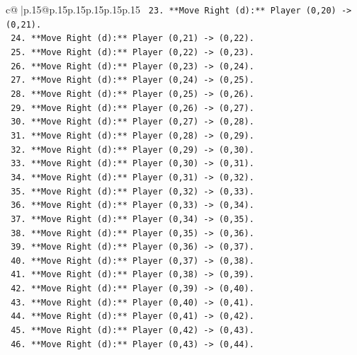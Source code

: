 \documentclass{article}
\begin{document}
{\begin{supertabular}{c@{$\;$}|p{.15\linewidth}@{}p{.15\linewidth}p{.15\linewidth}p{.15\linewidth}p{.15\linewidth}p{.15\linewidth}}
{{{\texttt{        23. **Move Right (d):** Player (0,20) {-}> (0,21).} \\
\texttt{        24. **Move Right (d):** Player (0,21) {-}> (0,22).} \\
\texttt{        25. **Move Right (d):** Player (0,22) {-}> (0,23).} \\
\texttt{        26. **Move Right (d):** Player (0,23) {-}> (0,24).} \\
\texttt{        27. **Move Right (d):** Player (0,24) {-}> (0,25).} \\
\texttt{        28. **Move Right (d):** Player (0,25) {-}> (0,26).} \\
\texttt{        29. **Move Right (d):** Player (0,26) {-}> (0,27).} \\
\texttt{        30. **Move Right (d):** Player (0,27) {-}> (0,28).} \\
\texttt{        31. **Move Right (d):** Player (0,28) {-}> (0,29).} \\
\texttt{        32. **Move Right (d):** Player (0,29) {-}> (0,30).} \\
\texttt{        33. **Move Right (d):** Player (0,30) {-}> (0,31).} \\
\texttt{        34. **Move Right (d):** Player (0,31) {-}> (0,32).} \\
\texttt{        35. **Move Right (d):** Player (0,32) {-}> (0,33).} \\
\texttt{        36. **Move Right (d):** Player (0,33) {-}> (0,34).} \\
\texttt{        37. **Move Right (d):** Player (0,34) {-}> (0,35).} \\
\texttt{        38. **Move Right (d):** Player (0,35) {-}> (0,36).} \\
\texttt{        39. **Move Right (d):** Player (0,36) {-}> (0,37).} \\
\texttt{        40. **Move Right (d):** Player (0,37) {-}> (0,38).} \\
\texttt{        41. **Move Right (d):** Player (0,38) {-}> (0,39).} \\
\texttt{        42. **Move Right (d):** Player (0,39) {-}> (0,40).} \\
\texttt{        43. **Move Right (d):** Player (0,40) {-}> (0,41).} \\
\texttt{        44. **Move Right (d):** Player (0,41) {-}> (0,42).} \\
\texttt{        45. **Move Right (d):** Player (0,42) {-}> (0,43).} \\
\texttt{        46. **Move Right (d):** Player (0,43) {-}> (0,44).} \\
}}}
\end{supertabular}}
\end{document}
